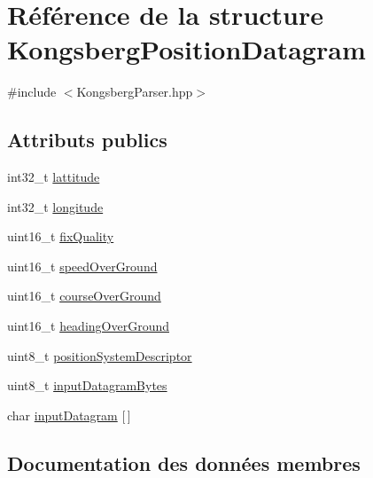 \hypertarget{structKongsbergPositionDatagram}{}\section{Référence de la structure Kongsberg\+Position\+Datagram}
\label{structKongsbergPositionDatagram}


{\ttfamily \#include $<$Kongsberg\+Parser.\+hpp$>$}

\subsection*{Attributs publics}
\begin{DoxyCompactItemize}
\item 
int32\+\_\+t \hyperlink{structKongsbergPositionDatagram_af646b9ea92c5ed64681cba92ab239b2d}{lattitude}
\item 
int32\+\_\+t \hyperlink{structKongsbergPositionDatagram_ad04de5c214e7960cf367e27f17917018}{longitude}
\item 
uint16\+\_\+t \hyperlink{structKongsbergPositionDatagram_aa3f323f2c83d64f19e93dec2e2a13e02}{fix\+Quality}
\item 
uint16\+\_\+t \hyperlink{structKongsbergPositionDatagram_aa9c2f762a33122e51be19a03c352bbdb}{speed\+Over\+Ground}
\item 
uint16\+\_\+t \hyperlink{structKongsbergPositionDatagram_a28337f508d4203f0f2b1861f3a6dab2f}{course\+Over\+Ground}
\item 
uint16\+\_\+t \hyperlink{structKongsbergPositionDatagram_a79313e4f9ccce7eb4d445e34c09b8729}{heading\+Over\+Ground}
\item 
uint8\+\_\+t \hyperlink{structKongsbergPositionDatagram_abc78a2814969d748412fbbca3cd65d79}{position\+System\+Descriptor}
\item 
uint8\+\_\+t \hyperlink{structKongsbergPositionDatagram_abf735cc8022c20b00db5d9bbd208fc8e}{input\+Datagram\+Bytes}
\item 
char \hyperlink{structKongsbergPositionDatagram_a2135add2e5535a0a76e93292b358ecf7}{input\+Datagram} \mbox{[}$\,$\mbox{]}
\end{DoxyCompactItemize}


\subsection{Documentation des données membres}
\mbox{\label{structKongsbergPositionDatagram_a28337f508d4203f0f2b1861f3a6dab2f}} 
